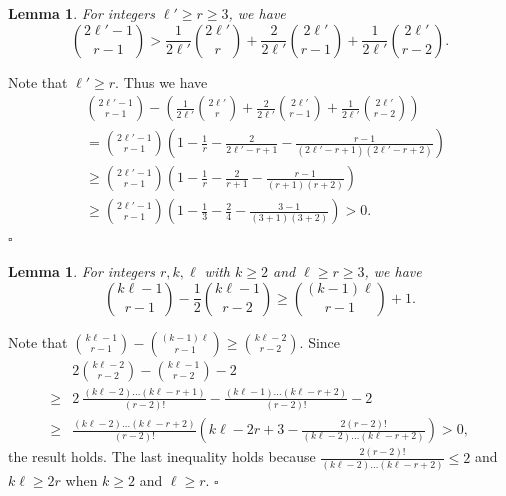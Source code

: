 \documentclass[12pt]{article}%
\newtheorem{lemma}[theorem]{Lemma}
\newenvironment{proof}{{\noindent\it Proof.}}{\hfill $\square$\par}
\begin{document}
 \begin{lemma}\label{lemma: first}
     For integers $\ell'\geq r\geq 3$, we have
     \begin{equation*}
         \binom{2\ell'-1}{r-1}>\frac{1}{2\ell'}\binom{2\ell'}{r}+\frac{2}{2\ell'}\binom{2\ell'}{r-1}+\frac{1}{2\ell'}\binom{2\ell'}{r-2}.
     \end{equation*}
 \end{lemma}
 \begin{proof}
Note that $\ell'\geq r$. Thus we have
     \begin{equation*}
    \begin{aligned}
        &\binom{2\ell'-1}{r-1}-\left(\frac{1}{2\ell'}\binom{2\ell'}{r}+\frac{2}{2\ell'}\binom{2\ell'}{r-1}+\frac{1}{2\ell'}\binom{2\ell'}{r-2}\right)\\
        &=\binom{2\ell'-1}{r-1}\left(1-\frac{1}{r}-\frac{2}{2\ell'-r+1}-\frac{r-1}{(2\ell'-r+1)(2\ell'-r+2)}\right)\\
        &\geq \binom{2\ell'-1}{r-1}\left(1-\frac{1}{r}-\frac{2}{r+1}-\frac{r-1}{(r+1)(r+2)}\right)\\
        &\geq \binom{2\ell'-1}{r-1}\left(1-\frac{1}{3}-\frac{2}{4}-\frac{3-1}{(3+1)(3+2)}\right)>0.
    \end{aligned}
\end{equation*}
 \end{proof}
 \begin{lemma}\label{lem: the ineuqlaity in sec 4 (1)}
 For integers $r,k,\ell$ with $k\geq 2$ and $\ell\geq r\geq 3$, we have
     $$\binom{k\ell-1}{r-1}-\frac{1}{2}\binom{k\ell-1}{r-2}\geq \binom{(k-1)\ell}{r-1}+1.$$
 \end{lemma}
 \begin{proof}
    Note that $\binom{k\ell-1}{r-1}-\binom{(k-1)\ell}{r-1}\geq \binom{k\ell-2}{r-2}$. Since
     \begin{equation*}
         \begin{aligned}
             &2\binom{k\ell-2}{r-2}-\binom{k\ell-1}{r-2}-2\\
             \geq & 2~\frac{(k\ell-2)\dots(k\ell-r+1)}{(r-2)!}-\frac{(k\ell-1)\dots(k\ell-r+2)}{(r-2)!}-2\\
             \geq &\frac{(k\ell-2)\dots(k\ell-r+2)}{(r-2)!}\left( k\ell-2r+3-\frac{2(r-2)!}{(k\ell-2)\dots(k\ell-r+2)}\right)>0,
         \end{aligned}
     \end{equation*}the result holds.
     The last inequality holds because $\frac{2(r-2)!}{(k\ell-2)\dots(k\ell-r+2)}\leq 2$ and $k\ell\geq 2r$ when $k\geq 2$ and $\ell\geq r$. %
 \end{proof}
\end{document}
